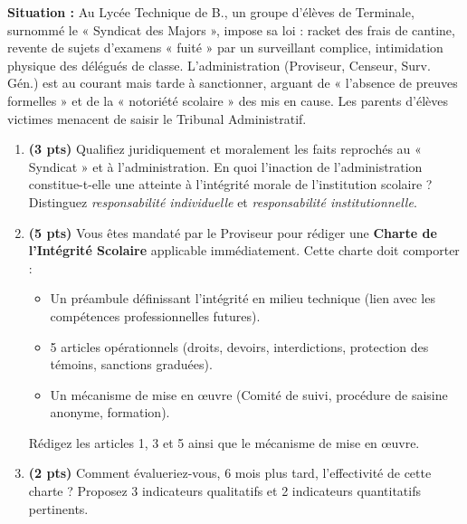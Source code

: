 \documentclass[11pt]{article}
\begin{document}
\begin{exercice}
\textbf{Situation :} Au Lycée Technique de B., un groupe d'élèves de Terminale, surnommé le « Syndicat des Majors », impose sa loi : racket des frais de cantine, revente de sujets d'examens « fuité » par un surveillant complice, intimidation physique des délégués de classe. L'administration (Proviseur, Censeur, Surv. Gén.) est au courant mais tarde à sanctionner, arguant de « l'absence de preuves formelles » et de la « notoriété scolaire » des mis en cause. Les parents d'élèves victimes menacent de saisir le Tribunal Administratif.

\begin{enumerate}
    \item \textbf{(3 pts)} Qualifiez juridiquement et moralement les faits reprochés au « Syndicat » et à l'administration. En quoi l'inaction de l'administration constitue-t-elle une atteinte à l'intégrité morale de l'institution scolaire ? Distinguez \textit{responsabilité individuelle} et \textit{responsabilité institutionnelle}.
    \item \textbf{(5 pts)} Vous êtes mandaté par le Proviseur pour rédiger une \textbf{Charte de l'Intégrité Scolaire} applicable immédiatement. Cette charte doit comporter : 
    \begin{itemize}
        \item Un préambule définissant l'intégrité en milieu technique (lien avec les compétences professionnelles futures).
        \item 5 articles opérationnels (droits, devoirs, interdictions, protection des témoins, sanctions graduées).
        \item Un mécanisme de mise en œuvre (Comité de suivi, procédure de saisine anonyme, formation).
    \end{itemize}
    Rédigez les articles 1, 3 et 5 ainsi que le mécanisme de mise en œuvre.
    \item \textbf{(2 pts)} Comment évalueriez-vous, 6 mois plus tard, l'effectivité de cette charte ? Proposez 3 indicateurs qualitatifs et 2 indicateurs quantitatifs pertinents.
\end{enumerate}
\end{exercice}
\end{document}
